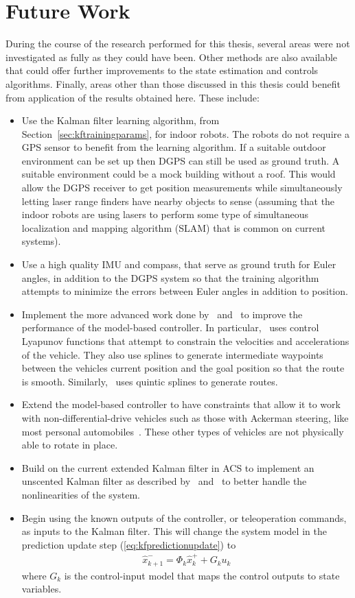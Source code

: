 \section{Future Work}%
\label{sec:futureWork}
During the course of the research performed for this thesis, several areas were not investigated as fully as they could have been. Other methods are also available that could offer further improvements to the state estimation and controls algorithms. Finally, areas other than those discussed in this thesis could benefit from application of the results obtained here. These include:
\begin{itemize}
\item Use the Kalman filter learning algorithm, from Section~\ref{sec:kftrainingparams}, for indoor robots. The robots do not require a GPS sensor to benefit from the learning algorithm. If a suitable outdoor environment can be set up then DGPS can still be used as ground truth. A suitable environment could be a mock building without a roof. This would allow the DGPS receiver to get position measurements while simultaneously letting laser range finders have nearby objects to sense (assuming that the indoor robots are using lasers to perform some type of simultaneous localization and mapping algorithm (SLAM) that is common on current systems).
\item Use a high quality IMU and compass, that serve as ground truth for Euler angles, in addition to the DGPS system so that the training algorithm attempts to minimize the errors between Euler angles in addition to position.
\item Implement the more advanced work done by~\cite{Lapierre06} and~\cite{Gulati08} to improve the performance of the model-based controller. In particular,~\cite{Gulati08} uses control Lyapunov functions that attempt to constrain the velocities and accelerations of the vehicle. They also use splines to generate intermediate waypoints between the vehicles current position and the goal position so that the route is smooth. Similarly,~\cite{Burgard09} uses quintic splines to generate routes.
\item Extend the model-based controller to have constraints that allow it to work with non-differential-drive vehicles such as those with Ackerman steering, like most personal automobiles~\cite{Shiller91dynamicmotion}. These other types of vehicles are not physically able to rotate in place.
\item Build on the current extended Kalman filter in ACS to implement an unscented Kalman filter as described by~\cite{ThrunProbRobots06} and~\cite{Orderud05} to better handle the nonlinearities of the system.
\item Begin using the known outputs of the controller, or teleoperation commands, as inputs to the Kalman filter. This will change the system model in the prediction update step (\ref{eq:kfpredictionupdate}) to
\begin{align*}
\hat{x}_{k+1}^- = \Phi_k \hat{x}_k^+ + G_k u_k
\end{align*}
where $G_k$ is the control-input model that maps the control outputs to state variables.
\end{itemize}
